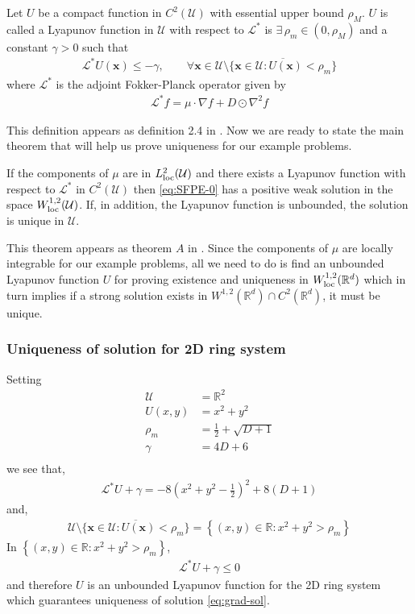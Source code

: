 \begin{defn}
    Let $U$ be a compact function in $C^2(\mathcal U)$ with essential upper bound $\rho_M$. $U$ is called a Lyapunov function in $\mathcal U$ with respect to $\mathcal L^*$ is $\exists\,\rho_m\in(0, \rho_M)$ and a constant $\gamma>0$ such that
    \begin{align}
        \mathcal L^* U(\mathbf x)\le -\gamma,\qquad\forall \mathbf x\in \mathcal U\setminus\overline{\{\mathbf x\in\mathcal U: U(\mathbf x)<\rho_m\}}
    \end{align}
    where $\mathcal L^*$ is the adjoint Fokker-Planck operator given by
    \begin{align}
        \mathcal L^*f = \mu\cdot\nabla f+ D\odot\nabla^2 f \label{eq:def-adjoint-FP-op}
    \end{align}
\end{defn}
This definition appears as definition 2.4 in \cite{huang2015steady}.
Now we are ready to state the main theorem that will help us prove uniqueness for our example problems.
\begin{thm}
    If the components of $\mu$ are in $L^2_{\rm loc}(\mathcal U)$ and there exists a Lyapunov function with respect to $\mathcal L^*$ in $C^2(\mathcal U)$ then \eqref{eq:SFPE-0} has a positive weak solution in the space $W^{1, 2}_{\rm loc}(\mathcal U)$. If, in addition,
the Lyapunov function is unbounded, the solution is unique in $\mathcal U$.
\end{thm}
This theorem appears as theorem $A$ in \cite{huang2015steady}. Since the components of $\mu$ are locally integrable for our example problems, all we need to do is find an unbounded Lyapunov function $U$ for proving existence and uniqueness in $W^{1,2}_{\rm loc}(\mathbb R^d)$ which in turn implies if a strong solution exists in $W^{1, 2}(\mathbb R^d)\cap C^2(\mathbb R^d)$, it must be unique.
\subsubsection{Uniqueness of solution for 2D ring system}\label{sssec-2D-unique}
Setting 
\begin{align}
\mathcal U &= \mathbb R^2\\
U(x, y) &= x^2+y^2\\
\rho_m &= \frac{1}{2}+\sqrt{D+1}\\
\gamma &= 4D+6\\
\end{align}
we see that,
\begin{align}
    \mathcal L^*U +\gamma = -8\left(x^2+y^2-\frac{1}{2}\right)^2 + 8(D+1)
\end{align}
and,
\begin{align}
    \mathcal U\setminus\overline{\{\mathbf x\in\mathcal U: U(\mathbf x)<\rho_m\}} = \left\{(x,y)\in\mathbb R: x^2+y^2>\rho_m\right\}
\end{align}
In  $\left\{(x,y)\in\mathbb R: x^2+y^2>\rho_m\right\}$, 
\begin{align}
    \mathcal L^*U+\gamma \le 0
\end{align}
and therefore $U$ is an unbounded Lyapunov function for the 2D ring system which guarantees uniqueness of solution \eqref{eq:grad-sol}.

